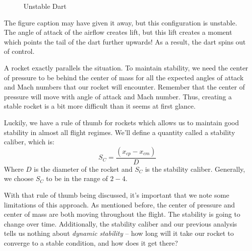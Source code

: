 \documentclass[10pt, openany, titlepage]{book}
\theoremstyle{definition}
\begin{document}
\begin{figure}[ht]

    \caption{Unstable Dart}
    \label{fig:unstable dart}
\end{figure}

The figure caption may have given it away, but this configuration is unstable. The angle of attack of the airflow creates lift, but this lift creates a moment which points the tail of the dart further upwards! As a result, the dart spins out of control.

A rocket exactly parallels the situation. To maintain stability, we need the center of pressure to be behind the center of mass for all the expected angles of attack and Mach numbers that our rocket will encounter. Remember that the center of pressure will move with angle of attack and Mach number. Thus, creating a stable rocket is a bit more difficult than it seems at first glance.

Luckily, we have a rule of thumb for rockets which allows us to maintain good stability in almost all flight regimes. We'll define a quantity called a stability caliber, which is:
$$S_C=\frac{(x_{cp}-x_{cm})}{D}$$
Where $D$ is the diameter of the rocket and $S_C$ is the stability caliber. Generally, we choose $S_C$ to be in the range of $2-4$. 

With that rule of thumb being discussed, it's important that we note some limitations of this approach. As mentioned before, the center of pressure and center of mass are both moving throughout the flight. The stability is going to change over time. Additionally, the stability caliber and our previous analysis tells us nothing about \textit{dynamic stability} -- how long will it take our rocket to converge to a stable condition, and how does it get there?
\end{document}
